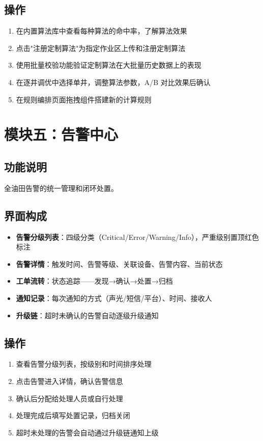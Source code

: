 \documentclass[11pt,a4paper]{ctexart}
\begin{document}
\subsection{操作}
\begin{enumerate}[leftmargin=*]
  \item 在内置算法库中查看每种算法的命中率，了解算法效果
  \item 点击"注册定制算法"为指定作业区上传和注册定制算法
  \item 使用批量校验功能验证定制算法在大批量历史数据上的表现
  \item 在逐井调优中选择单井，调整算法参数，A/B 对比效果后确认
  \item 在规则编排页面拖拽组件搭建新的计算规则
\end{enumerate}

\section{模块五：告警中心}

\subsection{功能说明}
全油田告警的统一管理和闭环处置。

\subsection{界面构成}
\begin{itemize}[leftmargin=*]
  \item \textbf{告警分级列表}：四级分类（Critical/Error/Warning/Info），严重级别置顶红色标注
  \item \textbf{告警详情}：触发时间、告警等级、关联设备、告警内容、当前状态
  \item \textbf{工单流转}：状态追踪——发现→确认→处置→归档
  \item \textbf{通知记录}：每次通知的方式（声光/短信/平台）、时间、接收人
  \item \textbf{升级链}：超时未确认的告警自动逐级升级通知
\end{itemize}

\subsection{操作}
\begin{enumerate}[leftmargin=*]
  \item 查看告警分级列表，按级别和时间排序处理
  \item 点击告警进入详情，确认告警信息
  \item 确认后分配给处理人员或自行处理
  \item 处理完成后填写处置记录，归档关闭
  \item 超时未处理的告警会自动通过升级链通知上级
\end{enumerate}
\end{document}
